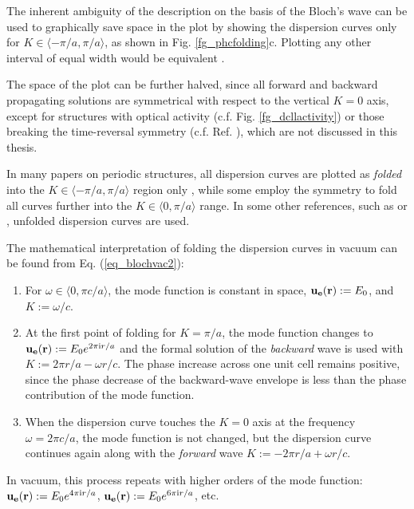 \label{par_disp_curv_per}
The inherent ambiguity of the description on the basis of the Bloch's wave can be used to graphically save space in the plot by showing the dispersion curves only for $K\in\langle-\pi/a, \pi/a\rangle$, as shown in Fig. \ref{fg_phcfolding}c. Plotting any other interval of equal width would be equivalent \cite[p. 177]{brillouin2003wave}. 

The space of the plot can be further halved, since all forward and backward propagating solutions are symmetrical with respect to the vertical $K=0$ axis, except for structures with optical activity (c.f. Fig. \ref{fg_dcllactivity}) or those breaking the time-reversal symmetry (c.f. Ref. \cite{vanwolleghem2009unidirectional}), which are not discussed in this thesis. 

In many papers on periodic structures, all dispersion curves are plotted as \textit{folded} into the $K\in\langle -\pi/a, \pi/a\rangle$ region only \cite{obrien2002photonic, yannopapas2005negative, chakrabarti2012magnetic}, while some employ the symmetry to fold  all curves further into the $K\in\langle0, \pi/a\rangle$ range. %
In some other references, such as \cite{mortensen2010unambiguous} or \cite{yeh1977electromagnetic}, unfolded dispersion curves are used.

The mathematical interpretation of folding the dispersion curves in vacuum can be found from Eq. (\ref{eq_blochvac2}): 
\begin{enumerate}
\item{
For  $\omega\in\langle 0, \pi c /a\rangle$, the mode function is constant in space, $\mathbf{u_e}({\mathbf{r}}) := E_0$, and $K := \omega/c$. 
} 
\item{
At the first point of folding for $K=\pi/a$, the mode function changes to $\mathbf{u_e}({\mathbf{r}}) := E_0 e^{2\pi{\mathrm i} r/a}$ and the formal solution of the \textit{backward} wave is used with $K := 2\pi r/a - \omega r/c$.  The phase increase across one unit cell remains positive, since the phase decrease of the backward-wave envelope is less than the phase contribution of the mode function.
} 
\item{
When the dispersion curve touches the $K=0$ axis at the frequency $\omega = 2\pi c/a$, the mode function is not changed, but the dispersion curve continues again along with the \textit{forward} wave $K := - 2\pi r/a + \omega r/c$. 
} 
 \end{enumerate}
In vacuum, this process repeats with higher orders of the mode function: $\mathbf{u_e}({\mathbf{r}}) := E_0 e^{4\pi{\mathrm i} r/a}$, $\mathbf{u_e}({\mathbf{r}}) := E_0 e^{6\pi{\mathrm i} r/a}$, etc.

